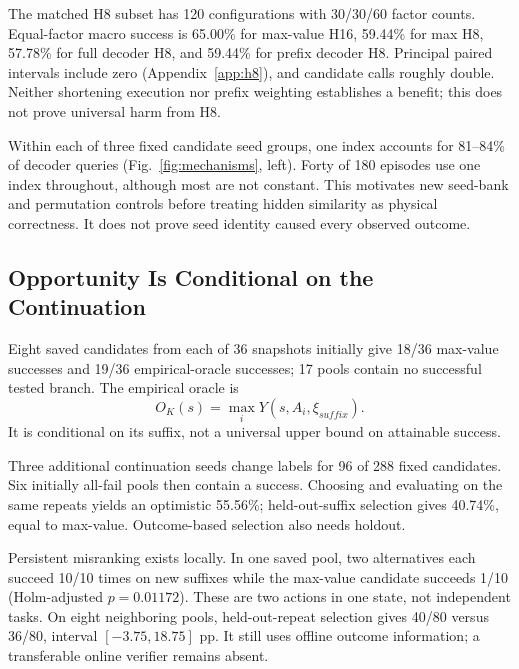 \documentclass{article}
\begin{document}
\begin{table}[t]
\caption{Decoder H16 and fixed-index controls. Each factor has 60 cases;
total is out of 180. Indices are zero-based.}
\label{tab:decoder}
\centering\small
\end{table}

The matched H8 subset has 120 configurations with 30/30/60 factor counts.
Equal-factor macro success is 65.00\% for max-value H16, 59.44\% for max H8,
57.78\% for full decoder H8, and 59.44\% for prefix decoder H8.
Principal paired intervals include zero (Appendix~\ref{app:h8}), and candidate
calls roughly double. Neither shortening execution nor prefix weighting
establishes a benefit; this does not prove universal harm from H8.

Within each of three fixed candidate seed groups, one index accounts for
81--84\% of decoder queries (Fig.~\ref{fig:mechanisms}, left).
Forty of 180 episodes use one index throughout, although most are not constant.
This motivates new seed-bank and permutation controls before treating hidden
similarity as physical correctness. It does not prove seed identity caused
every observed outcome.

\subsection{Opportunity Is Conditional on the Continuation}
Eight saved candidates from each of 36 snapshots initially give 18/36 max-value
successes and 19/36 empirical-oracle successes; 17 pools contain no successful
tested branch. The empirical oracle is
\begin{equation}
O_K(s)=\max_i Y(s,A_i,\xi_{suffix}).
\end{equation}
It is conditional on its suffix, not a universal upper bound on attainable success.

Three additional continuation seeds change labels for 96 of 288 fixed candidates.
Six initially all-fail pools then contain a success. Choosing and evaluating
on the same repeats yields an optimistic 55.56\%; held-out-suffix selection
gives 40.74\%, equal to max-value. Outcome-based selection also needs holdout.

Persistent misranking exists locally. In one saved pool, two alternatives
each succeed 10/10 times on new suffixes while the max-value candidate
succeeds 1/10 (Holm-adjusted $p=0.01172$). These are two actions in one state,
not independent tasks. On eight neighboring pools, held-out-repeat selection
gives 40/80 versus 36/80, interval $[-3.75,18.75]$ pp. It still uses offline outcome
information; a transferable online verifier remains absent.
\end{document}
